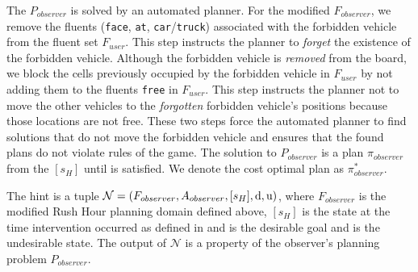 The $P_{observer}$ is solved by an automated planner. 
For the modified $F_{observer}$, we remove the fluents (\texttt{face}, \texttt{at}, \texttt{car}/\texttt{truck}) associated with the forbidden vehicle from the fluent set $F_{user}$.
This step instructs the planner to \textit{forget} the existence of the forbidden vehicle.
Although the forbidden vehicle is \textit{removed} from the board, we block the cells previously occupied by the forbidden vehicle in $F_{user}$ by not adding them to the fluents \texttt{free} in $F_{user}$.
This step instructs the planner not to move the other vehicles to the \textit{forgotten} forbidden vehicle's positions because those locations are not free.
These two steps force the automated planner to find solutions that do not move the forbidden vehicle and ensures that the found plans do not violate rules of the game.
The solution to $P_{observer}$ is a plan $\pi_{observer}$ from the $[s_H]$ until \desired is satisfied.
We denote the cost optimal plan as $\pi^{*}_{observer}$.

\begin{definition}
\label{def:hint}
The hint is a tuple $\mathcal{N}= (F_{observer}, A_{observer}, [s_H], \mathrm{d}, \mathrm{u})$, where $F_{observer}$ is the modified Rush Hour planning domain defined above, $[s_H]$ is the state at the time intervention occurred as defined in \historyDef and \desired is the desirable goal and \undesired is the undesirable state.
The output of $\mathcal{N}$ is a property of the observer's planning problem $P_{observer}$.
\end{definition}

